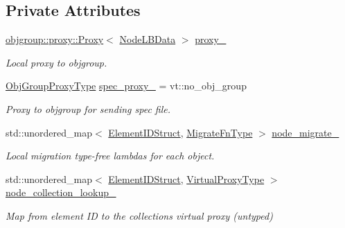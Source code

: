 \subsection*{Private Attributes}
\begin{DoxyCompactItemize}
\item 
\hyperlink{structvt_1_1objgroup_1_1proxy_1_1_proxy}{objgroup\+::proxy\+::\+Proxy}$<$ \hyperlink{structvt_1_1vrt_1_1collection_1_1balance_1_1_node_l_b_data}{Node\+L\+B\+Data} $>$ \hyperlink{structvt_1_1vrt_1_1collection_1_1balance_1_1_node_l_b_data_a72ce69b4edce524cd5960eb3ed856f26}{proxy\+\_\+}
\begin{DoxyCompactList}\small\item\em Local proxy to objgroup. \end{DoxyCompactList}\item 
\hyperlink{namespacevt_ad7cae989df485fccca57f0792a880a8e}{Obj\+Group\+Proxy\+Type} \hyperlink{structvt_1_1vrt_1_1collection_1_1balance_1_1_node_l_b_data_a6c5b8fc44e6710f090c4a78f5ffb0c71}{spec\+\_\+proxy\+\_\+} = vt\+::no\+\_\+obj\+\_\+group
\begin{DoxyCompactList}\small\item\em Proxy to objgroup for sending spec file. \end{DoxyCompactList}\item 
std\+::unordered\+\_\+map$<$ \hyperlink{namespacevt_1_1vrt_1_1collection_1_1balance_a9f5b53fafb270212279a4757d2c4cd28}{Element\+I\+D\+Struct}, \hyperlink{structvt_1_1vrt_1_1collection_1_1balance_1_1_node_l_b_data_a200140e389d08dc8d74db16589e736bc}{Migrate\+Fn\+Type} $>$ \hyperlink{structvt_1_1vrt_1_1collection_1_1balance_1_1_node_l_b_data_a4e325cee830c96b4c4129538367fbf37}{node\+\_\+migrate\+\_\+}
\begin{DoxyCompactList}\small\item\em Local migration type-\/free lambdas for each object. \end{DoxyCompactList}\item 
std\+::unordered\+\_\+map$<$ \hyperlink{namespacevt_1_1vrt_1_1collection_1_1balance_a9f5b53fafb270212279a4757d2c4cd28}{Element\+I\+D\+Struct}, \hyperlink{namespacevt_a1b417dd5d684f045bb58a0ede70045ac}{Virtual\+Proxy\+Type} $>$ \hyperlink{structvt_1_1vrt_1_1collection_1_1balance_1_1_node_l_b_data_a87a5425b7dd71812ba4952340cf01946}{node\+\_\+collection\+\_\+lookup\+\_\+}
\begin{DoxyCompactList}\small\item\em Map from element ID to the collection\textquotesingle{}s virtual proxy (untyped) \end{DoxyCompactList}\item 

\end{DoxyCompactItemize}
